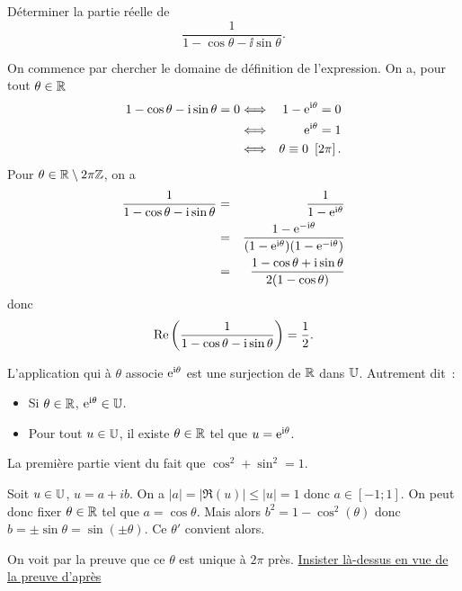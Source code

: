 \documentclass{magnoliaold}
\begin{document}
\begin{exoUnique}
\exo Déterminer la partie réelle de
  \[\frac{1}{1-\cos\theta-\ii\sin\theta}.\]
  \begin{sol}
  On commence par chercher le domaine de définition de l'expression. On a, pour tout $\theta\in\mathbb{R}$
  \begin{eqnarray*}
1-\cos\theta-{\rm i}\sin\theta=0
&\Longleftrightarrow& 1-{\rm e}^{{\rm i} \theta}=0\\
&\Longleftrightarrow& {\rm e}^{{\rm i} \theta}=1\\
&\Longleftrightarrow& \theta\equiv 0\ \left[2\pi\right].
  \end{eqnarray*}
  Pour $\theta\in\mathbb{R}\setminus 2\pi\mathbb{Z}$, on a
  \begin{eqnarray*}
\frac{1}{1-\cos\theta-{\rm i}\sin\theta}
&=& \frac{1}{1-{\rm e}^{{\rm i}\theta}}\\
&=& \frac{1-{\rm e}^{-{\rm i}\theta}}{(1-{\rm e}^{{\rm i}\theta})(1-{\rm e}^{-{\rm i}\theta})}\\
&=& \frac{1-\cos\theta+{\rm i}\sin\theta}{2(1-\cos\theta)}
  \end{eqnarray*}
  donc
  \[\mathop{\rm Re}\left(\frac{1}{1-\cos\theta-{\rm i}\sin\theta}\right)=\frac{1}{2}.\] 
  \end{sol}
\end{exoUnique}


\begin{proposition}[utile=-3,nom={Paramétrisation de $\U$ par \og l'exponentielle $\ii\theta$ \fg}]
L'application qui à $\theta$ associe ${\rm e}^{{\rm i}\theta}$ est une surjection de $\mathbb{R}$
dans $\U$. Autrement dit~:
\begin{itemize}
\item Si $\theta\in\mathbb{R}$, $\e^{\ii\theta}\in\U$.
\item Pour tout $u\in\U$, il existe $\theta\in\mathbb{R}$ tel que $u={\rm e}^{{\rm i}\theta}$.
\end{itemize}
\end{proposition}

\begin{preuve}
La première partie vient du fait que $\cos^2+\sin^2=1$.

Soit $u\in \U$, $u=a+ib$. On a $|a|=|\Re(u)|\leq |u|=1$ donc $a\in [-1;1]$. On peut donc fixer $\theta\in \mathbb{R}$ tel que $a=\cos \theta$. Mais alors $b^2=1-\cos^2(\theta)$ donc $b=\pm \sin \theta=\sin(\pm \theta)$. Ce $\theta'$ convient alors.

On voit par la preuve que ce $\theta$ est unique à $2\pi$ près. \underline{Insister là-dessus en vue de la preuve d'après}
\end{preuve}
\end{document}
